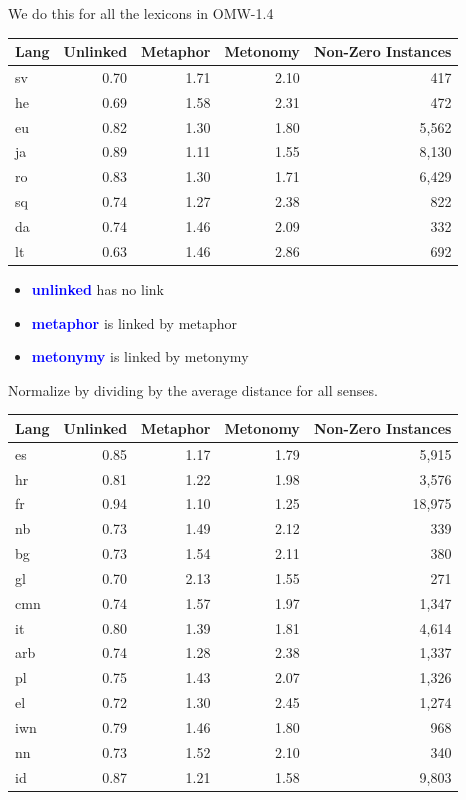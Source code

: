 \documentclass[xetex]{beamer}
\newcommand{\txx}[1]{\textbf{\textcolor{blue}{#1}}}
\begin{document}
\begin{frame}[allowframebreaks]{We do this for all the lexicons in OMW-1.4}

 
  \begin{center}
  \begin{tabular}{lrrrr}
    Lang & Unlinked & Metaphor & Metonomy & Non-Zero Instances \\ \hline
sv & 0.70 & 1.71 & 2.10 & 417   \\
he & 0.69 & 1.58 & 2.31 & 472   \\
eu & 0.82 & 1.30 & 1.80 & 5,562  \\
ja & 0.89 & 1.11 & 1.55 & 8,130 \\
ro & 0.83 & 1.30 & 1.71 & 6,429 \\
sq & 0.74 & 1.27 & 2.38 & 822 \\
da & 0.74 & 1.46 & 2.09 & 332 \\
lt & 0.63 & 1.46 & 2.86 & 692 \\
 \end{tabular}
\end{center}

\begin{itemize}
\item \txx{unlinked} has no link
\item \txx{metaphor} is linked by metaphor
\item \txx{metonymy} is linked by metonymy
\end{itemize}
Normalize by dividing  by the average distance for all senses.

  \begin{center}
  \begin{tabular}{lrrrr}
    Lang & Unlinked & Metaphor & Metonomy & Non-Zero Instances \\ \hline
es & 0.85 & 1.17 & 1.79 & 5,915 \\
 hr & 0.81 & 1.22 & 1.98 & 3,576 \\
    fr & 0.94 & 1.10 & 1.25 & 18,975 \\
nb & 0.73 & 1.49 & 2.12 & 339 \\
bg & 0.73 & 1.54 & 2.11 & 380 \\
gl & 0.70 & 2.13 & 1.55 & 271 \\
cmn & 0.74 & 1.57 & 1.97 & 1,347 \\
it & 0.80 & 1.39 & 1.81 & 4,614 \\
arb & 0.74 & 1.28 & 2.38 & 1,337 \\
pl & 0.75 & 1.43 & 2.07 & 1,326 \\
el & 0.72 & 1.30 & 2.45 & 1,274 \\
iwn & 0.79 & 1.46 & 1.80 & 968 \\
nn & 0.73 & 1.52 & 2.10 & 340 \\
id & 0.87 & 1.21 & 1.58 & 9,803 \\
  \end{tabular}
\end{center}


\end{frame}
\end{document}
